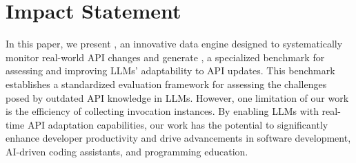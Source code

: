 \section*{Impact Statement}
In this paper, we present \method, an innovative data engine designed to systematically monitor real-world API changes and generate \benchmark, a specialized benchmark for assessing and improving LLMs' adaptability to API updates. This benchmark establishes a standardized evaluation framework for assessing the challenges posed by outdated API knowledge in LLMs. However, one limitation of our work is the efficiency of collecting invocation instances. By enabling LLMs with real-time API adaptation capabilities, our work has the potential to significantly enhance developer productivity and drive advancements in software development, AI-driven coding assistants, and programming education.